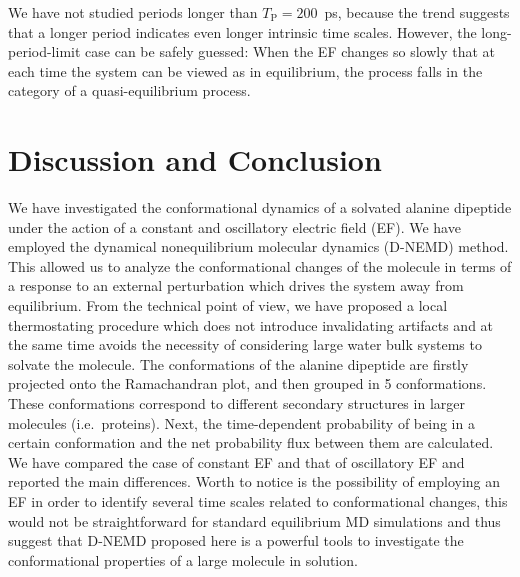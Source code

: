 \documentclass[a4paper,preprint,unsortedaddress,onecolumn]{revtex4-1}
\newcommand{\period}[0]{T_{\textrm{P}}}
\begin{document}
We have not studied periods longer than $\period =200$~ps, because
the trend suggests that a longer period indicates even longer intrinsic time scales.
However, the long-period-limit case can be safely guessed: When
the EF changes so slowly that
at each time the system
can be viewed as in equilibrium,
the process falls in the category of a quasi-equilibrium
process. 

\section{Discussion and Conclusion}
We have investigated the conformational
dynamics of a solvated alanine dipeptide under the action of a constant and oscillatory electric
field (EF).
We have employed the dynamical nonequilibrium molecular dynamics
(D-NEMD) method. This allowed us to analyze the conformational changes
of the molecule in terms of a response to an external perturbation
which drives the system away from equilibrium. From the technical
point of view, we have proposed a local thermostating procedure which
does not introduce invalidating artifacts and at the same time avoids
the necessity of considering large water bulk systems to solvate the
molecule.
The conformations of the alanine dipeptide are
firstly projected onto the Ramachandran plot, and
then grouped in 5  conformations.
These conformations
correspond to different secondary structures in larger molecules
(i.e.~proteins).
Next, the time-dependent probability
of being in a certain conformation and the net probability flux
between them are calculated.
We have compared the case of constant EF and that of oscillatory EF
and reported the main differences.
Worth to notice is the possibility of employing an EF in order to identify several time scales related to conformational changes, this would not be straightforward for standard equilibrium MD simulations and thus suggest that D-NEMD proposed here is a powerful tools to investigate the conformational properties of a large molecule in solution.
\end{document}
